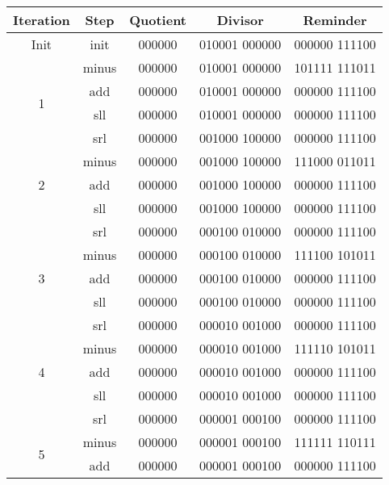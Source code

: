 \documentclass[paper=a4, fontsize=11pt]{scrartcl} %
\begin{document}
\begin{table}[hp]
    \centering
    \begin{tabular}{ccccc}
        Iteration             & Step  & Quotient & Divisor     & Reminder \\
        \toprule
        \multirow{1}{*}{Init} & init  & 000000 & 010001 000000 & 000000 111100 \\
        \midrule
        \multirow{4}{*}{1}    & minus & 000000 & 010001 000000 & 101111 111011 \\
                              & add   & 000000 & 010001 000000 & 000000 111100 \\
                              & sll   & 000000 & 010001 000000 & 000000 111100 \\
                              & srl   & 000000 & 001000 100000 & 000000 111100 \\
        \midrule
        \multirow{3}{*}{2}    & minus & 000000 & 001000 100000 & 111000 011011 \\
                              & add   & 000000 & 001000 100000 & 000000 111100 \\
                              & sll   & 000000 & 001000 100000 & 000000 111100 \\
                              & srl   & 000000 & 000100 010000 & 000000 111100 \\
        \midrule
        \multirow{3}{*}{3}    & minus & 000000 & 000100 010000 & 111100 101011 \\
                              & add   & 000000 & 000100 010000 & 000000 111100 \\
                              & sll   & 000000 & 000100 010000 & 000000 111100 \\
                              & srl   & 000000 & 000010 001000 & 000000 111100 \\
        \midrule
        \multirow{3}{*}{4}    & minus & 000000 & 000010 001000 & 111110 101011 \\
                              & add   & 000000 & 000010 001000 & 000000 111100 \\
                              & sll   & 000000 & 000010 001000 & 000000 111100 \\
                              & srl   & 000000 & 000001 000100 & 000000 111100 \\
        \midrule
        \multirow{3}{*}{5}    & minus & 000000 & 000001 000100 & 111111 110111 \\
                              & add   & 000000 & 000001 000100 & 000000 111100 \\

\end{tabular}
\end{table}
\end{document}
